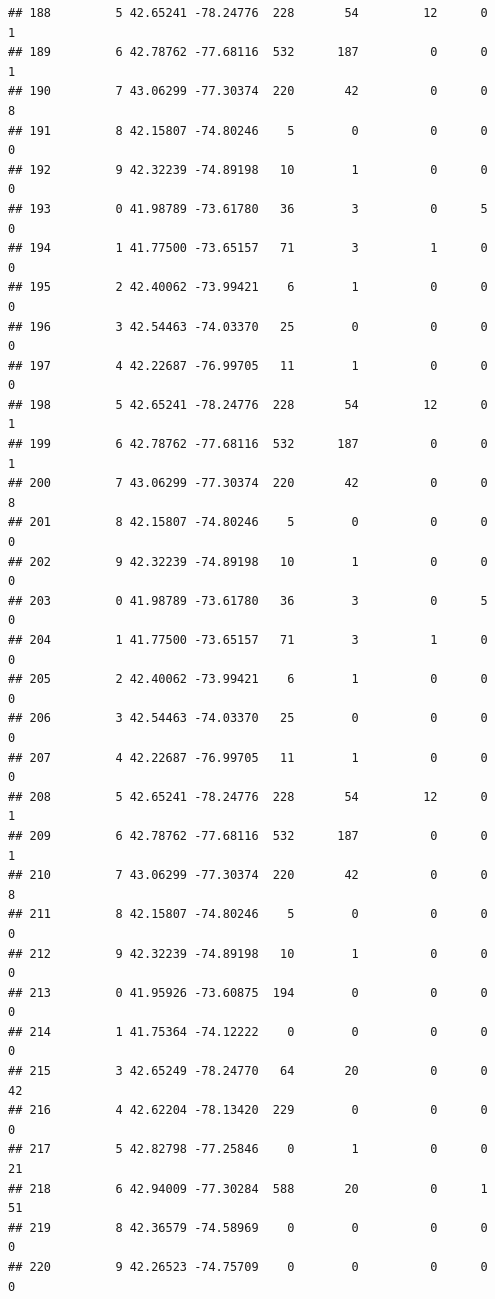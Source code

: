 \documentclass[
]{article}
\begin{document}
\begin{verbatim}
## 188         5 42.65241 -78.24776  228       54         12      0            1
## 189         6 42.78762 -77.68116  532      187          0      0            1
## 190         7 43.06299 -77.30374  220       42          0      0            8
## 191         8 42.15807 -74.80246    5        0          0      0            0
## 192         9 42.32239 -74.89198   10        1          0      0            0
## 193         0 41.98789 -73.61780   36        3          0      5            0
## 194         1 41.77500 -73.65157   71        3          1      0            0
## 195         2 42.40062 -73.99421    6        1          0      0            0
## 196         3 42.54463 -74.03370   25        0          0      0            0
## 197         4 42.22687 -76.99705   11        1          0      0            0
## 198         5 42.65241 -78.24776  228       54         12      0            1
## 199         6 42.78762 -77.68116  532      187          0      0            1
## 200         7 43.06299 -77.30374  220       42          0      0            8
## 201         8 42.15807 -74.80246    5        0          0      0            0
## 202         9 42.32239 -74.89198   10        1          0      0            0
## 203         0 41.98789 -73.61780   36        3          0      5            0
## 204         1 41.77500 -73.65157   71        3          1      0            0
## 205         2 42.40062 -73.99421    6        1          0      0            0
## 206         3 42.54463 -74.03370   25        0          0      0            0
## 207         4 42.22687 -76.99705   11        1          0      0            0
## 208         5 42.65241 -78.24776  228       54         12      0            1
## 209         6 42.78762 -77.68116  532      187          0      0            1
## 210         7 43.06299 -77.30374  220       42          0      0            8
## 211         8 42.15807 -74.80246    5        0          0      0            0
## 212         9 42.32239 -74.89198   10        1          0      0            0
## 213         0 41.95926 -73.60875  194        0          0      0            0
## 214         1 41.75364 -74.12222    0        0          0      0            0
## 215         3 42.65249 -78.24770   64       20          0      0           42
## 216         4 42.62204 -78.13420  229        0          0      0            0
## 217         5 42.82798 -77.25846    0        1          0      0           21
## 218         6 42.94009 -77.30284  588       20          0      1           51
## 219         8 42.36579 -74.58969    0        0          0      0            0
## 220         9 42.26523 -74.75709    0        0          0      0            0

\end{verbatim}
\end{document}
